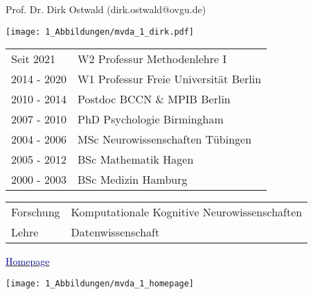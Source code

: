 \documentclass[
  8pt,
  ignorenonframetext,
]{beamer}
\begin{document}
\begin{frame}[plain]{}
\protect\hypertarget{section-3}{}
\vfill
\begin{large}
Prof. Dr. Dirk Ostwald (dirk.ostwald@ovgu.de)
\end{large}
\vspace{.7cm}

\begin{minipage}{.3\linewidth}
\begin{center}
\texttt{[image: 1\_Abbildungen/mvda\_1\_dirk.pdf]}
\end{center}
\end{minipage}
\begin{minipage}{.7\linewidth}
\begin{small}
\renewcommand{\arraystretch}{1.3}
\begin{tabular}{ll}
Seit 2021   & W2 Professur Methodenlehre I              \\
2014 - 2020 & W1 Professur Freie Universität Berlin     \\
2010 - 2014 & Postdoc BCCN \& MPIB Berlin               \\
2007 - 2010 & PhD Psychologie Birmingham                \\
2004 - 2006 & MSc Neurowissenschaften Tübingen          \\
2005 - 2012 & BSc Mathematik Hagen                      \\
2000 - 2003 & BSc Medizin Hamburg                       \\
\end{tabular}
\end{small}
\end{minipage}
\vspace{.7cm}

\begin{large}
\begin{tabular}{ll}
Forschung   & Komputationale Kognitive Neurowissenschaften  \\
Lehre       & Datenwissenschaft
\end{tabular}
\end{large}
\vfill
\end{frame}

\begin{frame}{}
\protect\hypertarget{section-4}{}
\href{https://www.ipsy.ovgu.de/methodenlehre_I-path-980,1404.html}{\textcolor{darkblue}{Homepage}}

\begin{center}\texttt{[image: 1\_Abbildungen/mvda\_1\_homepage]} \end{center}
\end{frame}
\end{document}
